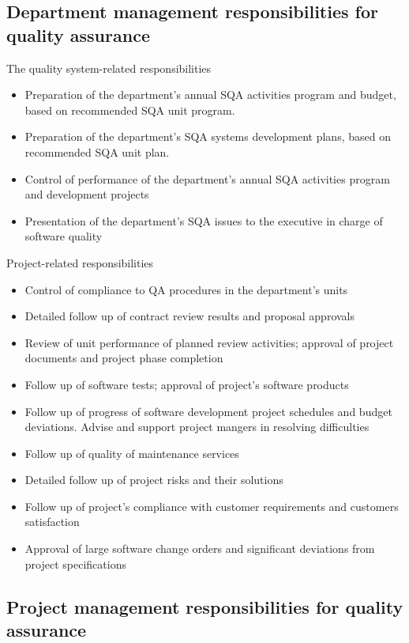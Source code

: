 \documentclass{article}
\begin{document}
\subsection{Department management responsibilities for quality assurance}

\begin{flushleft}
The quality system-related responsibilities
\begin{itemize}
  \item Preparation of the department’s annual SQA activities program and budget, based on recommended SQA unit program.
  \item Preparation of the department’s SQA systems development plans, based on recommended SQA unit plan.
  \item Control of performance of the department’s annual SQA activities program and development projects
  \item Presentation of the department's SQA issues to the executive in charge of software quality
\end{itemize}
Project-related responsibilities
\begin{itemize}
  \item Control of compliance to QA procedures in the department's units
  \item Detailed follow up of contract review results and proposal approvals
  \item Review of unit performance of planned review activities; approval of project documents and project phase completion
  \item Follow up of software tests; approval of project’s software products
  \item Follow up of progress of software development project schedules and budget deviations. Advise and support project mangers in resolving difficulties
  \item Follow up of quality of maintenance services
  \item Detailed follow up of project risks and their solutions
  \item Follow up of project's compliance with customer requirements and customers satisfaction
  \item Approval of large software change orders and significant deviations from project specifications
\end{itemize}
\end{flushleft}

\subsection{Project management responsibilities for quality assurance}
\end{document}
